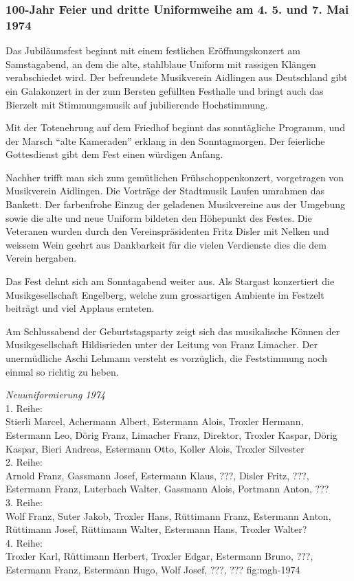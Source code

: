 \begin{history}
    \subsubsection{100-Jahr Feier und dritte Uniformweihe am 4. 5. und 7. Mai 1974}

    Das Jubiläumsfest beginnt mit einem festlichen Eröffnungskonzert am
    Samstagabend, an dem die alte, stahlblaue Uniform mit rassigen Klängen
    verabschiedet wird. Der befreundete Musikverein Aidlingen aus Deutschland
    gibt ein Galakonzert in der zum Bersten gefüllten Festhalle und bringt auch
    das Bierzelt mit Stimmungsmusik auf jubilierende Hochstimmung.

    Mit der Totenehrung auf dem Friedhof beginnt das sonntägliche Programm, und
    der Marsch \enquote{alte Kameraden} erklang in den Sonntagmorgen. Der
    feierliche Gottesdienst gibt dem Fest einen würdigen Anfang.

    Nachher trifft man sich zum gemütlichen Frühschoppenkonzert, vorgetragen von
    Musikverein Aidlingen. Die Vorträge der Stadtmusik Laufen umrahmen das
    Bankett. Der farbenfrohe Einzug der geladenen Musikvereine aus der Umgebung
    sowie die alte und neue Uniform bildeten den Höhepunkt des Festes. Die
    Veteranen wurden durch den Vereinspräsidenten Fritz Disler mit Nelken und
    weissem Wein geehrt aus Dankbarkeit für die vielen Verdienste dies die dem
    Verein hergaben.

    Das Fest dehnt sich am Sonntagabend weiter aus. Als Stargast konzertiert die
    Musikgesellschaft Engelberg, welche zum grossartigen Ambiente im Festzelt
    beiträgt und viel Applaus ernteten.

    Am Schlussabend der Geburtstagsparty zeigt sich das musikalische Können der
    Musikgesellschaft Hildisrieden unter der Leitung von Franz Limacher. Der
    unermüdliche Aschi Lehmann versteht es vorzüglich, die Feststimmung noch
    einmal so richtig zu heben.

\end{history}

{\emph{Neuuniformierung 1974}\\
    1. Reihe:\\
    Stierli Marcel, Achermann Albert, Estermann Alois, Troxler Hermann,
    Estermann Leo, Dörig Franz, Limacher Franz, Direktor, Troxler Kaspar, Dörig
    Kaspar, Bieri Andreas, Estermann Otto, Koller Alois, Troxler Silvester\\
    2. Reihe:\\
    Arnold Franz, Gassmann Josef, Estermann Klaus, ???, Disler Fritz, ???,
    Estermann Franz, Luterbach Walter, Gassmann Alois, Portmann Anton, ???\\
    3. Reihe:\\
    Wolf Franz, Suter Jakob, Troxler Hans, Rüttimann Franz, Estermann Anton,
    Rüttimann Josef, Rüttimann Walter, Estermann Hans, Troxler Walter?\\
    4. Reihe:\\
    Troxler Karl, Rüttimann Herbert, Troxler Edgar, Estermann Bruno, ???,
    Estermann Franz, Estermann Hugo, Wolf Josef, ???, ??? } {fig:mgh-1974}